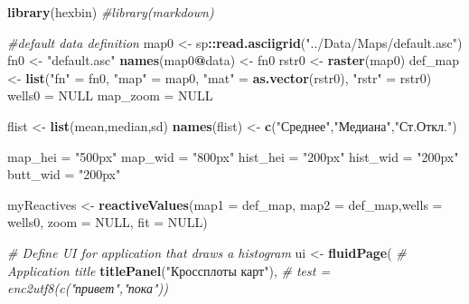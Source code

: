 \documentclass[]{article}
\newenvironment{Shaded}{\begin{snugshade}}{\end{snugshade}}
\newcommand{\KeywordTok}[1]{\textcolor[rgb]{0.13,0.29,0.53}{\textbf{#1}}}
\newcommand{\DataTypeTok}[1]{\textcolor[rgb]{0.13,0.29,0.53}{#1}}
\newcommand{\StringTok}[1]{\textcolor[rgb]{0.31,0.60,0.02}{#1}}
\newcommand{\CommentTok}[1]{\textcolor[rgb]{0.56,0.35,0.01}{\textit{#1}}}
\newcommand{\OtherTok}[1]{\textcolor[rgb]{0.56,0.35,0.01}{#1}}
\newcommand{\OperatorTok}[1]{\textcolor[rgb]{0.81,0.36,0.00}{\textbf{#1}}}
\newcommand{\NormalTok}[1]{#1}
\begin{document}
\begin{Shaded}
\begin{Highlighting}[]
\KeywordTok{library}\NormalTok{(hexbin)}
\CommentTok{#library(markdown)}

\CommentTok{#default data definition}
\NormalTok{map0 <-}\StringTok{ }\NormalTok{sp}\OperatorTok{::}\KeywordTok{read.asciigrid}\NormalTok{(}\StringTok{"../Data/Maps/default.asc"}\NormalTok{)}
\NormalTok{fn0 <-}\StringTok{ "default.asc"}
\KeywordTok{names}\NormalTok{(map0}\OperatorTok{@}\NormalTok{data) <-}\StringTok{ }\NormalTok{fn0}
\NormalTok{rstr0 <-}\StringTok{ }\KeywordTok{raster}\NormalTok{(map0)}
\NormalTok{def_map <-}\StringTok{ }\KeywordTok{list}\NormalTok{(}\StringTok{"fn"}\NormalTok{ =}\StringTok{ }\NormalTok{fn0,}
                \StringTok{"map"}\NormalTok{ =}\StringTok{ }\NormalTok{map0,}
                \StringTok{"mat"}\NormalTok{ =}\StringTok{ }\KeywordTok{as.vector}\NormalTok{(rstr0),}
                \StringTok{"rstr"}\NormalTok{ =}\StringTok{ }\NormalTok{rstr0)}
\NormalTok{wells0 =}\StringTok{ }\OtherTok{NULL}
\NormalTok{map_zoom =}\StringTok{ }\OtherTok{NULL}

\NormalTok{flist <-}\StringTok{ }\KeywordTok{list}\NormalTok{(mean,median,sd)}
\KeywordTok{names}\NormalTok{(flist) <-}\StringTok{ }\KeywordTok{c}\NormalTok{(}\StringTok{"Среднее"}\NormalTok{,}\StringTok{"Медиана"}\NormalTok{,}\StringTok{"Ст.Откл."}\NormalTok{)}

\NormalTok{map_hei =}\StringTok{ "500px"}
\NormalTok{map_wid =}\StringTok{ "800px"}
\NormalTok{hist_hei =}\StringTok{ "200px"}
\NormalTok{hist_wid =}\StringTok{ "200px"}
\NormalTok{butt_wid =}\StringTok{ "200px"}

\NormalTok{myReactives <-}\StringTok{ }\KeywordTok{reactiveValues}\NormalTok{(}\DataTypeTok{map1 =}\NormalTok{ def_map, }\DataTypeTok{map2 =}\NormalTok{ def_map,}\DataTypeTok{wells =}\NormalTok{ wells0, }\DataTypeTok{zoom =} \OtherTok{NULL}\NormalTok{, }\DataTypeTok{fit =} \OtherTok{NULL}\NormalTok{)}

\CommentTok{# Define UI for application that draws a histogram}
\NormalTok{ui <-}\StringTok{ }\KeywordTok{fluidPage}\NormalTok{(}
  \CommentTok{# Application title}
  \KeywordTok{titlePanel}\NormalTok{(}\StringTok{"Кроссплоты карт"}\NormalTok{),}
  \CommentTok{# test = enc2utf8(c("привет","пока"))}
  

\end{Highlighting}
\end{Shaded}
\end{document}
